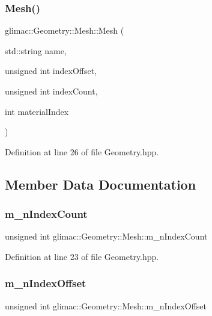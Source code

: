 \subsubsection{\texorpdfstring{Mesh()}{Mesh()}}
{\footnotesize\ttfamily glimac\+::\+Geometry\+::\+Mesh\+::\+Mesh (\begin{DoxyParamCaption}\item[{std\+::string}]{name,  }\item[{unsigned int}]{index\+Offset,  }\item[{unsigned int}]{index\+Count,  }\item[{int}]{material\+Index }\end{DoxyParamCaption})\hspace{0.3cm}{\ttfamily [inline]}}



Definition at line 26 of file Geometry.\+hpp.



\subsection{Member Data Documentation}
\mbox{\label{structglimac_1_1_geometry_1_1_mesh_a75519af4f04cd87eaea7bf091baaab07}} 
\subsubsection{\texorpdfstring{m\+\_\+n\+Index\+Count}{m\_nIndexCount}}
{\footnotesize\ttfamily unsigned int glimac\+::\+Geometry\+::\+Mesh\+::m\+\_\+n\+Index\+Count}



Definition at line 23 of file Geometry.\+hpp.

\mbox{\label{structglimac_1_1_geometry_1_1_mesh_a896417ec0e07c46755564808948053eb}} 
\subsubsection{\texorpdfstring{m\+\_\+n\+Index\+Offset}{m\_nIndexOffset}}
{\footnotesize\ttfamily unsigned int glimac\+::\+Geometry\+::\+Mesh\+::m\+\_\+n\+Index\+Offset}




